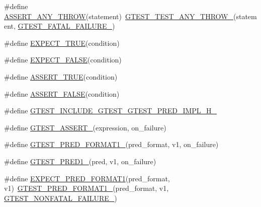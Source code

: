 \begin{DoxyCompactItemize}
\item 
\#define \hyperlink{fused-src_2gtest_2gtest_8h_affadeef9379fe5aabf6f28d9eab9d3c0}{\-A\-S\-S\-E\-R\-T\-\_\-\-A\-N\-Y\-\_\-\-T\-H\-R\-O\-W}(statement)~\hyperlink{gtest-internal_8h_af48bbd26d54d4afc5e4cef39b1c76ba3}{\-G\-T\-E\-S\-T\-\_\-\-T\-E\-S\-T\-\_\-\-A\-N\-Y\-\_\-\-T\-H\-R\-O\-W\-\_\-}(statement, \hyperlink{gtest-internal_8h_a0f9a4c3ea82cc7bf4478eaffdc168358}{\-G\-T\-E\-S\-T\-\_\-\-F\-A\-T\-A\-L\-\_\-\-F\-A\-I\-L\-U\-R\-E\-\_\-})
\item 
\#define \hyperlink{fused-src_2gtest_2gtest_8h_ac33e7cdfb5d44a7a0f0ab552eb5c3c6a}{\-E\-X\-P\-E\-C\-T\-\_\-\-T\-R\-U\-E}(condition)
\item 
\#define \hyperlink{fused-src_2gtest_2gtest_8h_aeb6c7ae89f440c90c1a1815951c836da}{\-E\-X\-P\-E\-C\-T\-\_\-\-F\-A\-L\-S\-E}(condition)
\item 
\#define \hyperlink{fused-src_2gtest_2gtest_8h_ae9244bfbda562e8b798789b001993fa5}{\-A\-S\-S\-E\-R\-T\-\_\-\-T\-R\-U\-E}(condition)
\item 
\#define \hyperlink{fused-src_2gtest_2gtest_8h_a8197fa52f3538588d20d8af4834c9003}{\-A\-S\-S\-E\-R\-T\-\_\-\-F\-A\-L\-S\-E}(condition)
\item 
\#define \hyperlink{fused-src_2gtest_2gtest_8h_a36afb7e44e600d2da0e6d8f4f739ea3b}{\-G\-T\-E\-S\-T\-\_\-\-I\-N\-C\-L\-U\-D\-E\-\_\-\-G\-T\-E\-S\-T\-\_\-\-G\-T\-E\-S\-T\-\_\-\-P\-R\-E\-D\-\_\-\-I\-M\-P\-L\-\_\-\-H\-\_\-}
\item 
\#define \hyperlink{fused-src_2gtest_2gtest_8h_a8c09939dd67f1bb5b68c9f6a44ea75db}{\-G\-T\-E\-S\-T\-\_\-\-A\-S\-S\-E\-R\-T\-\_\-}(expression, on\-\_\-failure)
\item 
\#define \hyperlink{fused-src_2gtest_2gtest_8h_aa3e3bfe04bb0e54d7f0e57e2f991d1eb}{\-G\-T\-E\-S\-T\-\_\-\-P\-R\-E\-D\-\_\-\-F\-O\-R\-M\-A\-T1\-\_\-}(pred\-\_\-format, v1, on\-\_\-failure)
\item 
\#define \hyperlink{fused-src_2gtest_2gtest_8h_ad44cf322952076d85305bbdf39769ac1}{\-G\-T\-E\-S\-T\-\_\-\-P\-R\-E\-D1\-\_\-}(pred, v1, on\-\_\-failure)
\item 
\#define \hyperlink{fused-src_2gtest_2gtest_8h_a07132aa62cf4902e50e68d0265f573b6}{\-E\-X\-P\-E\-C\-T\-\_\-\-P\-R\-E\-D\-\_\-\-F\-O\-R\-M\-A\-T1}(pred\-\_\-format, v1)~\hyperlink{gtest__pred__impl_8h_aa3e3bfe04bb0e54d7f0e57e2f991d1eb}{\-G\-T\-E\-S\-T\-\_\-\-P\-R\-E\-D\-\_\-\-F\-O\-R\-M\-A\-T1\-\_\-}(pred\-\_\-format, v1, \hyperlink{gtest-internal_8h_a6cb7482cfa03661a91c698eb5895f642}{\-G\-T\-E\-S\-T\-\_\-\-N\-O\-N\-F\-A\-T\-A\-L\-\_\-\-F\-A\-I\-L\-U\-R\-E\-\_\-})

\end{DoxyCompactItemize}
